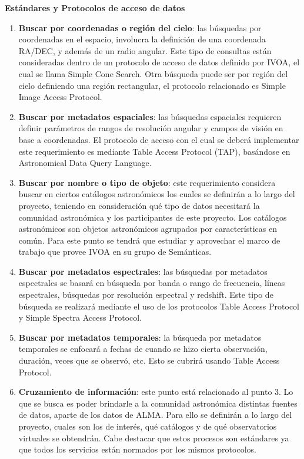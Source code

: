\textbf{Estándares y Protocolos de acceso de datos} \begin{enumerate} \item
\textbf{Buscar por coordenadas o región del cielo}: las búsquedas por
coordenadas en el espacio, involucra la definición de una coordenada RA/DEC, y
además de un radio angular. Este tipo de consultas están consideradas dentro de
un protocolo de acceso de datos definido por IVOA, el cual se llama Simple Cone
Search. Otra búsqueda puede ser por región del cielo definiendo una región
rectangular, el protocolo relacionado es Simple Image Access Protocol.

	\item \textbf{Buscar por metadatos espaciales}: las búsquedas
espaciales requieren definir parámetros de rangos de resolución angular y
campos de visión en base a coordenadas. El protocolo de acceso con el cual se
deberá implementar este requerimiento es mediante Table Access Protocol (TAP),
basándose en Astronomical Data Query Language.

	\item \textbf{Buscar por nombre o tipo de objeto}: este requerimiento
considera buscar en ciertos catálogos astronómicos los cuales se definirán a lo
largo del proyecto, teniendo en consideración qué tipo de datos necesitará la
comunidad astronómica y los participantes de este proyecto. Los catálogos
astronómicos son objetos astronómicos agrupados por características en común.
Para este punto se tendrá que estudiar y aprovechar el marco de trabajo que
provee IVOA en su grupo de Semánticas.

	\item \textbf{Buscar por metadatos espectrales}: las búsquedas por
metadatos espectrales se basará en búsqueda por banda o rango de frecuencia,
líneas espectrales, búsquedas por resolución espectral y redshift. Este tipo de
búsqueda se realizará mediante el uso de los protocolos Table Access Protocol y
Simple Spectra Access Protocol.

	\item \textbf{Buscar por metadatos temporales}: la búsqueda por
metadatos temporales se enfocará a fechas de cuando se hizo cierta observación,
duración, veces que se observó, etc. Esto se cubrirá usando Table Access
Protocol.

	\item \textbf{Cruzamiento de información}: este punto está relacionado
al punto 3. Lo que se busca es poder brindarle a la comunidad astronómica
distintas fuentes de datos, aparte de los datos de ALMA. Para ello se definirán
a lo largo del proyecto, cuales son los de interés, qué catálogos y de qué
observatorios virtuales se obtendrán. Cabe destacar que estos procesos son
estándares ya que todos los servicios están normados por los mismos protocolos.


\end{enumerate}
